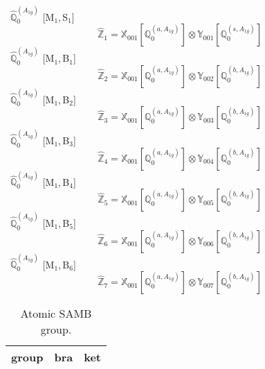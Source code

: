 \documentclass[fleqn,10pt,landscape]{article}
\begin{document}
\begin{itemize}
\vspace{4mm}
\noindent {} $\,\,\,\hat{\mathbb{Q}}_{0}^{(A_{1g})}$ [M$_{1}$,\,S$_{1}$]
\begin{dmath*}
\hat{\mathbb{Z}}_{1}=\mathbb{X}_{001}[\mathbb{Q}_{0}^{(a,A_{1g})}] \otimes\mathbb{Y}_{001}[\mathbb{Q}_{0}^{(s,A_{1g})}]
\end{dmath*}
\vspace{4mm}
\noindent {} $\,\,\,\hat{\mathbb{Q}}_{0}^{(A_{1g})}$ [M$_{1}$,\,B$_{1}$]
\begin{dmath*}
\hat{\mathbb{Z}}_{2}=\mathbb{X}_{001}[\mathbb{Q}_{0}^{(a,A_{1g})}] \otimes\mathbb{Y}_{002}[\mathbb{Q}_{0}^{(b,A_{1g})}]
\end{dmath*}
\vspace{4mm}
\noindent {} $\,\,\,\hat{\mathbb{Q}}_{0}^{(A_{1g})}$ [M$_{1}$,\,B$_{2}$]
\begin{dmath*}
\hat{\mathbb{Z}}_{3}=\mathbb{X}_{001}[\mathbb{Q}_{0}^{(a,A_{1g})}] \otimes\mathbb{Y}_{003}[\mathbb{Q}_{0}^{(b,A_{1g})}]
\end{dmath*}
\vspace{4mm}
\noindent {} $\,\,\,\hat{\mathbb{Q}}_{0}^{(A_{1g})}$ [M$_{1}$,\,B$_{3}$]
\begin{dmath*}
\hat{\mathbb{Z}}_{4}=\mathbb{X}_{001}[\mathbb{Q}_{0}^{(a,A_{1g})}] \otimes\mathbb{Y}_{004}[\mathbb{Q}_{0}^{(b,A_{1g})}]
\end{dmath*}
\vspace{4mm}
\noindent {} $\,\,\,\hat{\mathbb{Q}}_{0}^{(A_{1g})}$ [M$_{1}$,\,B$_{4}$]
\begin{dmath*}
\hat{\mathbb{Z}}_{5}=\mathbb{X}_{001}[\mathbb{Q}_{0}^{(a,A_{1g})}] \otimes\mathbb{Y}_{005}[\mathbb{Q}_{0}^{(b,A_{1g})}]
\end{dmath*}
\vspace{4mm}
\noindent {} $\,\,\,\hat{\mathbb{Q}}_{0}^{(A_{1g})}$ [M$_{1}$,\,B$_{5}$]
\begin{dmath*}
\hat{\mathbb{Z}}_{6}=\mathbb{X}_{001}[\mathbb{Q}_{0}^{(a,A_{1g})}] \otimes\mathbb{Y}_{006}[\mathbb{Q}_{0}^{(b,A_{1g})}]
\end{dmath*}
\vspace{4mm}
\noindent {} $\,\,\,\hat{\mathbb{Q}}_{0}^{(A_{1g})}$ [M$_{1}$,\,B$_{6}$]
\begin{dmath*}
\hat{\mathbb{Z}}_{7}=\mathbb{X}_{001}[\mathbb{Q}_{0}^{(a,A_{1g})}] \otimes\mathbb{Y}_{007}[\mathbb{Q}_{0}^{(b,A_{1g})}]
\end{dmath*}
\begin{center}
\renewcommand{\arraystretch}{1.3}
\begin{longtable}{c|c|c}
\caption{Atomic SAMB group.}
 \\
 \hline \hline
group & bra & ket \\ \hline \endfirsthead


\end{longtable}
\end{center}
\end{itemize}
\end{document}
